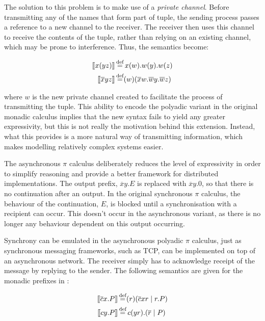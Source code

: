 The solution to this problem is to make use of a \emph{private
  channel}.  Before transmitting any of the names that form part of
tuple, the sending process passes a reference to a new channel to the
receiver.  The receiver then uses this channel to receive the contents
of the tuple, rather than relying on an existing channel, which may be
prone to interference.  Thus, the semantics become:

\begin{align}
\seml x(yz) \semr & \eqdef x(w).w(y).w(z) \\
\seml \overline{x}yz \semr & \eqdef (w)(\overline{x}w.\overline{w}y.\overline{w}z)
\end{align}

\noindent where $w$ is the new private channel created to facilitate
the process of transmitting the tuple.  This ability to encode the
polyadic variant in the original monadic calculus implies that the new
syntax fails to yield any greater expressivity, but this is not really
the motivation behind this extension.  Instead, what this provides is
a more natural way of transmitting information, which makes modelling
relatively complex systems easier.

The asynchronous $\pi$ calculus
\cite*{honda:asynchronouscommunication,boudol:asynchrony,sangiorgi:asynchronousprocesscalculi}
deliberately reduces the level of expressivity in order to simplify
reasoning and provide a better framework for distributed
implementations.  The output prefix, $\overline{x}y.E$ is replaced
with $\overline{x}y.0$, so that there is no continuation after an
output.  In the original synchronous $\pi$ calculus, the behaviour of
the continuation, $E$, is blocked until a synchronisation with a
recipient can occur.  This doesn't occur in the asynchronous variant,
as there is no longer any behaviour dependent on this output
occurring.

  Synchrony can be emulated in the asynchronous polyadic $\pi$
  calculus, just as synchronous messaging frameworks, such as TCP, can
  be implemented on top of an asynchronous network.  The receiver
  simply has to acknowledge receipt of the message by replying to the
  sender.  The following semantics are given for the monadic prefixes
  in \cite{boxedamb01}:

\begin{align}
\seml \overline{c}x.P \semr & \eqdef (r)(\overline{c}xr\;|\;r.P) \\
\seml cy.P \semr & \eqdef c(yr).(\overline{r}\;|\;P)
\end{align}

